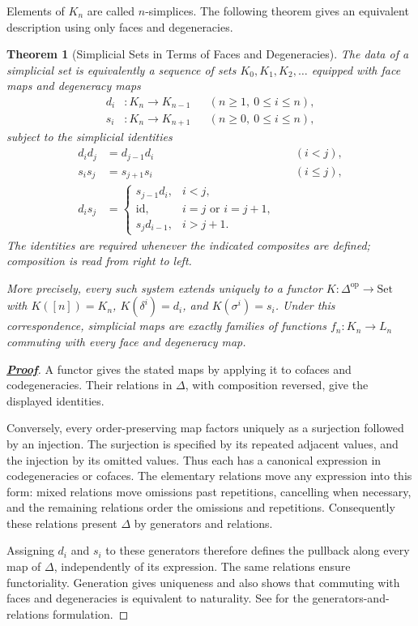 \documentclass[11pt]{article}
\newcommand{\proofdest}{}
\newcommand{\claim}[1]{\def\proofdest{proof:#1}\hypertarget{statement:#1}{}}
\theoremstyle{linked}
\newtheorem{theorem}[proposition]{Theorem}
\theoremstyle{plainlecture}
\newenvironment{linkedproof}[1]{\hypertarget{proof:#1}{}\begin{proof}[\normalfont\bfseries\hyperlink{statement:#1}{Proof}]}{\end{proof}}
\newcommand{\id}{\mathrm{id}}
\newcommand{\Set}{\mathrm{Set}}
\begin{document}
Elements of $K_n$ are called $n$-simplices. The following theorem gives an equivalent description using only faces and degeneracies.

\claim{simplicial-data}
\begin{theorem}[Simplicial Sets in Terms of Faces and Degeneracies]\label{thm:simplicial-data}
The data of a simplicial set is equivalently a sequence of sets
$K_0,K_1,K_2,\ldots$ equipped with face maps and degeneracy maps
\[
\begin{aligned}
 d_i &:K_n\longrightarrow K_{n-1}
 &&(n\geq1,\ 0\leq i\leq n),\\
 s_i &:K_n\longrightarrow K_{n+1}
 &&(n\geq0,\ 0\leq i\leq n),
\end{aligned}
\]
subject to the simplicial identities
\[
\begin{aligned}
d_i d_j&=d_{j-1}d_i &&(i<j),\\
s_i s_j&=s_{j+1}s_i &&(i\leq j),\\
d_i s_j&=
\begin{cases}
s_{j-1}d_i,&i<j,\\
\id,&i=j\text{ or }i=j+1,\\
s_jd_{i-1},&i>j+1.
\end{cases}
\end{aligned}
\]
The identities are required whenever the indicated composites are defined; composition is read from right to left.

More precisely, every such system extends uniquely to a functor
$K:\Delta^{\mathrm{op}}\to\Set$ with $K([n])=K_n$,
$K(\delta^i)=d_i$, and $K(\sigma^i)=s_i$.
Under this correspondence, simplicial maps are exactly families of functions
$f_n:K_n\to L_n$ commuting with every face and degeneracy map.
\end{theorem}
\begin{linkedproof}{simplicial-data}
A functor gives the stated maps by applying it to cofaces and codegeneracies. Their relations in $\Delta$, with composition reversed, give the displayed identities.

Conversely, every order-preserving map factors uniquely as a surjection followed by an injection. The surjection is specified by its repeated adjacent values, and the injection by its omitted values. Thus each has a canonical expression in codegeneracies or cofaces. The elementary relations move any expression into this form: mixed relations move omissions past repetitions, cancelling when necessary, and the remaining relations order the omissions and repetitions. Consequently these relations present $\Delta$ by generators and relations.

Assigning $d_i$ and $s_i$ to these generators therefore defines the pullback along every map of $\Delta$, independently of its expression. The same relations ensure functoriality. Generation gives uniqueness and also shows that commuting with faces and degeneracies is equivalent to naturality. See \cite{stacks-simplicial} for the generators-and-relations formulation.
\end{linkedproof}
\end{document}
